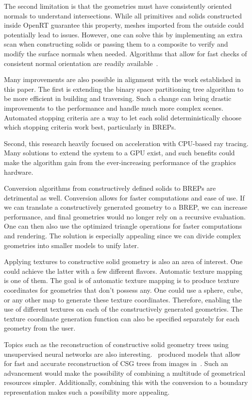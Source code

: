 \documentclass[a4paper,11pt,oneside]{article}
\begin{document}
The second limitation is that the geometries must have consistently oriented normals to understand intersections. While all primitives and solids constructed inside OpenRT guarantee this property, meshes imported from the outside could potentially lead to issues. However, one can solve this by implementing an extra scan when constructing solids or passing them to a composite to verify and modify the surface normals when needed. Algorithms that allow for fast checks of consistent normal orientation are readily available~\cite{normal_orientation}.

Many improvements are also possible in alignment with the work established in this paper. The first is extending the binary space partitioning tree algorithm to be more efficient in building and traversing. Such a change can bring drastic improvements to the performance and handle much more complex scenes. Automated stopping criteria are a way to let each solid deterministically choose which stopping criteria work best, particularly in BREPs.

Second, this research heavily focused on acceleration with CPU-based ray tracing. Many solutions to extend the system to a GPU exist, and such benefits could make the algorithm gain from the ever-increasing performance of the graphics hardware.

Conversion algorithms from constructively defined solids to BREPs are detrimental as well. Conversion allows for faster computations and ease of use. If we can translate a constructively generated geometry to a BREP,  we can increase performance, and final geometries would no longer rely on a recursive evaluation. One can then also use the optimized triangle operations for faster computations and rendering. The solution is especially appealing since we can divide complex geometries into smaller models to unify later.

Applying textures to constructive solid geometry is also an area of interest. One could achieve the latter with a few different flavors. Automatic texture mapping is one of them. The goal is of automatic texture mapping is to produce texture coordinates for geometries that don't possess any. One could use a sphere, cube, or any other map to generate these texture coordinates. Therefore, enabling the use of different textures on each of the constructively generated geometries.	 The texture coordinate generation function can also be specified separately for each geometry from the user.

Topics such as the reconstruction of constructive solid geometry trees using unsupervised neural networks are also interesting.~\citeauthor{ucsgnet_ml} produced models that allow for fast and accurate reconstruction of CSG trees from images in~\cite{ucsgnet_ml}. Such an advancement would make the possibility of combining a multitude of geometrical resources simpler. Additionally, combining this with the conversion to a boundary representation makes such a possibility more appealing.
  

\newpage
%
%
\printbibliography
\end{document}
